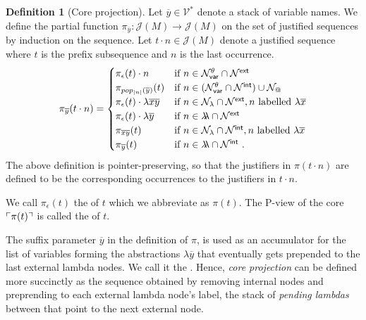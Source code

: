 \documentclass{article}
\makeatletter
\theoremstyle{definition}
\newtheorem{definition}{Definition}[section]
\newcommand\VarSet{\mathcal{V}}
\newcommand\Nodes{\mathcal{N}}%
\newcommand\NodesVar{\Nodes_{\sf var}}%
\newcommand\NodesLmd{\Nodes_\lambda}%
\newcommand\NodesApp{\Nodes_@}%
\newcommand{\ghostlmd}{{\lambda\!\!\lambda}}
\newcommand{\ghostvar}{\theta}
\newcommand\ImNodesVar{\NodesVar^\ghostvar}
\def\coresymbol{\pi} %
\newcommand{\core}[1]{\coresymbol(#1)} %
\newcommand{\ExtNodes}{\Nodes^{\sf ext}}
\newcommand{\IntNodes}{\Nodes^{\sf int}}
\def\justseqset{\mathcal{J}}
\makeatother
\begin{document}
\begin{definition}[Core projection]
\label{def:coreprojection}
Let $\overline{y} \in \VarSet^*$ denote a stack of variable names.
We define the partial function $\coresymbol_{\overline{y}}\colon \justseqset(M) \longrightarrow \justseqset(M)$ on the set of justified sequences by induction on the sequence.
Let $t \cdot n\in\justseqset(M)$ denote a justified sequence where $t$ is the prefix subsequence and $n$ is the last occurrence.
\begin{equation*}
\coresymbol_{\overline{y}}(t\cdot n) =
\begin{cases}
\coresymbol_{\epsilon}(t) \cdot n
    & \mbox{if } n\in\ImNodesVar\inter\ExtNodes \\
\coresymbol_{pop_{|n|}(\overline{y})}(t)
    & \mbox{if } n\in(\ImNodesVar\inter\IntNodes)\union\NodesApp \\
\coresymbol_{\epsilon}(t) \cdot \lambda \overline{x}\overline{y}
    & \mbox{if } n\in\NodesLmd\inter\ExtNodes, n \mbox{ labelled } \lambda\overline{x}\\
\coresymbol_{\epsilon}(t) \cdot\lambda\overline{y}
    & \mbox{if } n\in\ghostlmd\inter\ExtNodes \\
\coresymbol_{\overline{x} \overline{y}}(t)
    & \mbox{if } n\in\NodesLmd\inter\IntNodes, n \mbox{ labelled } \lambda\overline{x} \\
\coresymbol_{\overline{y}}(t)
    & \mbox{if } n\in\ghostlmd\inter\IntNodes \ .
\end{cases}
\end{equation*}
The above definition is pointer-preserving, so that the justifiers in $\coresymbol(t\cdot n)$ are defined to be the corresponding occurrences to the justifiers in $t \cdot n$.

We call $\coresymbol_\epsilon(t)$ the  of $t$ which we abbreviate as $\core{t}$. The P-view of the core $\pview{\core{t}}$ is called the  of $t$.
\end{definition}

The suffix parameter $\overline{y}$ in the definition of $\coresymbol$, is used as an accumulator for the list of variables forming the abstractions $\lambda \overline{y}$ that eventually gets prepended to the last external lambda nodes. We call it the . Hence, \emph{core projection} can be defined more succinctly as the sequence obtained by removing internal nodes and preprending to each external lambda node's label, the stack of \emph{pending lambdas} between that point to the next external node.
\end{document}

